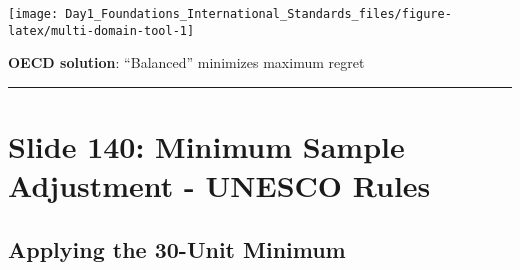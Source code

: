 \documentclass[
]{article}
\begin{document}
\texttt{[image: Day1\_Foundations\_International\_Standards\_files/figure-latex/multi-domain-tool-1]}

\textbf{OECD solution}: ``Balanced'' minimizes maximum regret

\begin{center}\rule{0.5\linewidth}{0.5pt}\end{center}

\section{Slide 140: Minimum Sample Adjustment - UNESCO
Rules}\label{slide-140-minimum-sample-adjustment---unesco-rules}

\subsection{Applying the 30-Unit
Minimum}\label{applying-the-30-unit-minimum}
\end{document}
